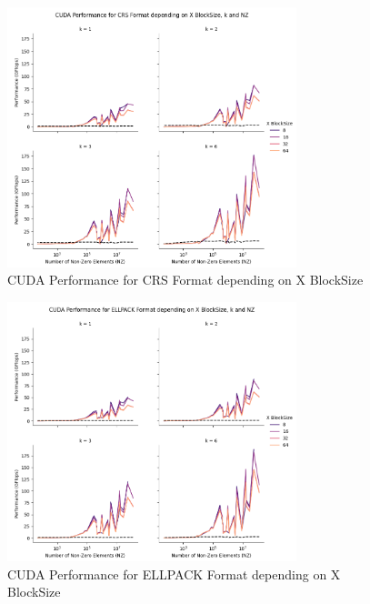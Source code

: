 \documentclass[12pt,oneside]{book} %
\begin{document}
\newpage
\begin{figure}[H]
    \centering
    \includegraphics[width=0.75\textwidth]{../results/images/CUDA_xBlockSize_CRS.png}
    \caption{CUDA Performance for CRS Format depending on X BlockSize}
    \label{fig:cudaxblocksizecrs}
\end{figure}

\begin{figure}[H]
    \centering
    \includegraphics[width=0.75\textwidth]{../results/images/CUDA_xBlockSize_ELLPACK.png}
    \caption{CUDA Performance for ELLPACK Format depending on X BlockSize}
    \label{fig:cudaxblocksizeellpack}
\end{figure}
\end{document}
